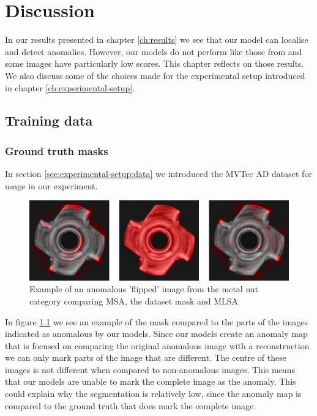 \chapter{Discussion}\label{ch:discussion}

In our results presented in chapter \ref{ch:results} we see that our model can localise and detect anomalies. However, our models do not perform like those from \cite{pirnay_inpainting_2021} and some images have particularly low scores. This chapter reflects on those results. We also discuss some of the choices made for the experimental setup introduced in chapter \ref{ch:experimental-setup}.

\section{Training data}

\subsection{Ground truth masks}

In section \ref{sec:experimental-setup:data} we introduced the MVTec AD dataset for usage in our experiment.

\begin{figure}[ht!]
\centering
\includegraphics[width=\textwidth]{imgs/samples/metal-nut_flip_anomap.jpg}
\caption{Example of an anomalous 'flipped' image from the metal nut category comparing MSA, the dataset mask and MLSA}
\label{fig:discussion:metal-nut-anomap}
\end{figure}

In figure \ref{fig:discussion:metal-nut-anomap} we see an example of the mask compared to the parts of the images indicated as anomalous by our models. Since our models create an anomaly map that is focused on comparing the original anomalous image with a reconstruction we can only mark parts of the image that are different. The centre of these images is not different when compared to non-anomalous images. This means that our models are unable to mark the complete image as the anomaly. This could explain why the segmentation is relatively low, since the anomaly map is compared to the ground truth that does mark the complete image.

